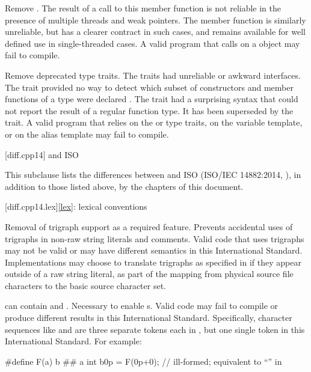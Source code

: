 \nodiffref
\change
Remove .
\rationale
The result of a call to this member function is not reliable in the presence of
multiple threads and weak pointers. The member function  is
similarly unreliable, but has a clearer contract in such cases, and remains
available for well defined use in single-threaded cases.
\effect
A valid \CppXVII{} program that calls  on a 
object may fail to compile.

\change
Remove deprecated type traits.
\rationale
The traits had unreliable or awkward interfaces. The 
trait provided no way to detect which subset of constructors and member
functions of a type were declared . The 
trait had a surprising syntax that could not report the result of a regular
function type. It has been superseded by the  trait.
\effect
A valid \CppXVII{} program that relies on the  or
 type traits, on the  variable template,
or on the  alias template may fail to compile.

[diff.cpp14]{\Cpp{} and ISO \CppXIV{}}

\pnum
{}%
This subclause lists the differences between \Cpp{} and
ISO \CppXIV{} (ISO/IEC 14882:2014, ),
in addition to those listed above,
by the chapters of this document.

[diff.cpp14.lex]{\ref{lex}: lexical conventions}

%
\change
Removal of trigraph support as a required feature.
\rationale
Prevents accidental uses of trigraphs in non-raw string literals and comments.
\effect
Valid \CppXIV{} code that uses trigraphs may not be valid or may have different
semantics in this International Standard. Implementations may choose to
translate trigraphs as specified in \CppXIV{} if they appear outside of a raw
string literal, as part of the  mapping from physical source file characters to
the basic source character set.

\change
{} can contain   and
 .
\rationale
Necessary to enable s.
\effect
Valid \CppXIV{} code may fail to compile or produce different results in
this International Standard. Specifically, character sequences like 
and  are three separate tokens each in \CppXIV{}, but one single token
in this International Standard.
For example:
\begin{codeblock}
#define F(a) b ## a
int b0p = F(0p+0);  // ill-formed; equivalent to ``\!'' in \CppXIV{}
\end{codeblock}

